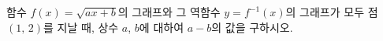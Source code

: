 \hspace*{2mm}\begin{minipage}[t]{\dimexpr\linewidth-2mm\relax}\vspace{0pt}
함수 $f(x)=\sqrt{ax+b}$의 그래프와 그 역함수 $y=f^{-1}(x)$의 그래프가 모두 점~$(1,\,2)$를 지날 때, 상수 $a$, $b$에 대하여 $a-b$의 값을 구하시오.\end{minipage}
